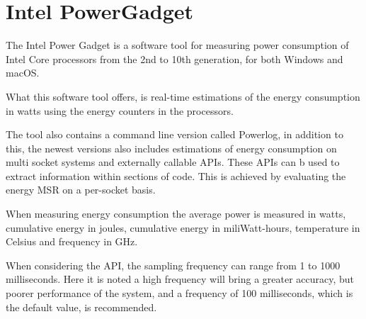 \section{Intel PowerGadget}

The Intel Power Gadget\cite[]{powergadget} is a software tool for measuring power consumption of Intel Core processors from the 2nd to 10th generation, for both Windows and macOS.

What this software tool offers, is real-time estimations of the energy consumption in watts using the energy counters in the processors.

The tool also contains a command line version called Powerlog, in addition to this, the newest versions also includes estimations of energy consumption on multi socket systems and externally callable APIs. These APIs can b used to extract information within sections of code. This is achieved by evaluating the energy MSR on a per-socket basis.

When measuring energy consumption the average power is measured in watts, cumulative energy in joules, cumulative energy in miliWatt-hours, temperature in Celsius and frequency in GHz.

When considering the API, the sampling frequency can range from 1 to 1000 milliseconds. Here it is noted a high frequency will bring a greater accuracy, but poorer performance of the system, and a frequency of 100 milliseconds, which is the default value, is recommended.\cite*[]{powergadget_api}